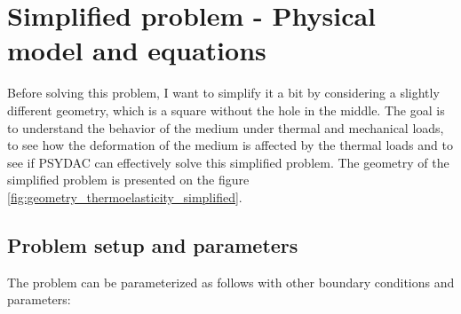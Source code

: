 \documentclass[a4paper,12pt,twoside]{report}
\begin{document}
\section{Simplified problem - Physical model and equations}

Before solving this problem, I want to simplify it a bit by considering a slightly different geometry, which is a square without the hole in the middle. The goal is to understand the behavior of the medium under thermal and mechanical loads, to see how the deformation of the medium is affected by the thermal loads and to see if PSYDAC can effectively solve this simplified problem. The geometry of the simplified problem is presented on the figure \ref{fig:geometry_thermoelasticity_simplified}.

\subsection{Problem setup and parameters}
\label{subsec:problem_setup_parameters}
The problem can be parameterized as follows with other boundary conditions and parameters:
\end{document}

